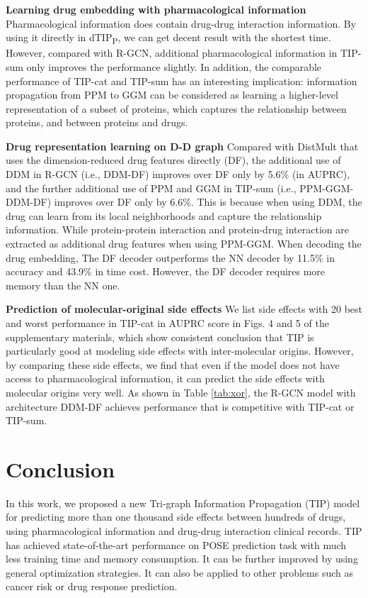 \documentclass{article}
\begin{document}
\textbf{Learning drug embedding with pharmacological information} Pharmacological information does contain drug-drug interaction information. By using it directly in dTIP\textsubscript{P}, we can get decent result with the shortest time. However, compared with R-GCN, additional pharmacological information in TIP-sum only improves the performance slightly.  In addition, the comparable performance of TIP-cat and TIP-sum has an interesting implication:
information propagation from PPM to GGM can be considered as learning a higher-level representation of a subset of proteins, which captures the relationship between proteins, and between proteins and drugs.

\textbf{Drug representation learning on D-D graph} Compared with DistMult that uses the dimension-reduced drug features directly (DF), the additional use of DDM in R-GCN (i.e., DDM-DF) improves over DF only by 5.6\% (in AUPRC), and the further additional use of PPM and GGM in TIP-sum (i.e., PPM-GGM-DDM-DF) improves over DF only by 6.6\%. This is because when using DDM, the drug can learn from its local neighborhoods and capture the relationship information. While protein-protein interaction and protein-drug interaction are extracted as additional drug features when using PPM-GGM. When decoding the drug embedding, The DF decoder outperforms the NN decoder by 11.5\% in accuracy and 43.9\% in time cost. However, the DF decoder requires more memory than the NN one.







\textbf{Prediction of molecular-original side effects} We list side effects with 20 best and worst performance in TIP-cat in AUPRC score in Figs. 4 and 5 of the supplementary materials, which show consistent conclusion that TIP is particularly good at modeling side  effects with inter-molecular origins.  However, by comparing these side effects, we find that even if the model does not have access to pharmacological information, it can predict the side effects with molecular origins very well. As shown in Table \ref{tab:xor}, the R-GCN model with architecture DDM-DF achieves performance that is competitive with TIP-cat or TIP-sum. 


\section{Conclusion}
\label{furture}
In this work, we proposed a new Tri-graph Information Propagation (TIP) model for predicting more than one thousand side effects between hundreds of drugs, using pharmacological information and drug-drug interaction clinical records. TIP has achieved state-of-the-art performance on POSE prediction task with much less training time and memory consumption. It can be further improved by using general optimization strategies. It can also be applied to other problems such as cancer risk or drug response prediction.
\end{document}
